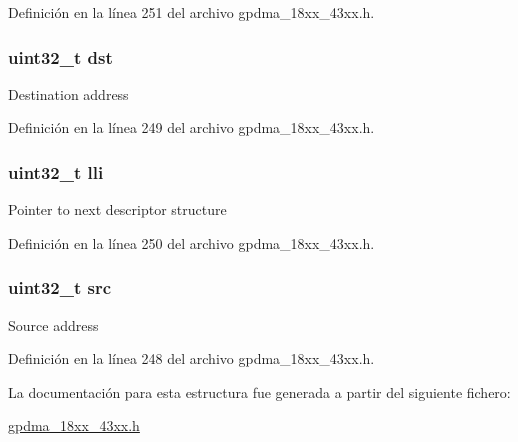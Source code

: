 Definición en la línea 251 del archivo gpdma\+\_\+18xx\+\_\+43xx.\+h.

\subsubsection[{\texorpdfstring{dst}{dst}}]{\setlength{\rightskip}{0pt plus 5cm}uint32\+\_\+t dst}\hypertarget{struct_d_m_a___transfer_descriptor_aa8b6a0c5900928c04c0cb42248821ce5}{}\label{struct_d_m_a___transfer_descriptor_aa8b6a0c5900928c04c0cb42248821ce5}
Destination address 

Definición en la línea 249 del archivo gpdma\+\_\+18xx\+\_\+43xx.\+h.

\subsubsection[{\texorpdfstring{lli}{lli}}]{\setlength{\rightskip}{0pt plus 5cm}uint32\+\_\+t lli}\hypertarget{struct_d_m_a___transfer_descriptor_a76f31eac518fe9f46e705a8a9610b12c}{}\label{struct_d_m_a___transfer_descriptor_a76f31eac518fe9f46e705a8a9610b12c}
Pointer to next descriptor structure 

Definición en la línea 250 del archivo gpdma\+\_\+18xx\+\_\+43xx.\+h.

\subsubsection[{\texorpdfstring{src}{src}}]{\setlength{\rightskip}{0pt plus 5cm}uint32\+\_\+t src}\hypertarget{struct_d_m_a___transfer_descriptor_a0d6d2cdb1162c6355e40ab772fa5debc}{}\label{struct_d_m_a___transfer_descriptor_a0d6d2cdb1162c6355e40ab772fa5debc}
Source address 

Definición en la línea 248 del archivo gpdma\+\_\+18xx\+\_\+43xx.\+h.



La documentación para esta estructura fue generada a partir del siguiente fichero\+:\begin{DoxyCompactItemize}
\item 
\hyperlink{gpdma__18xx__43xx_8h}{gpdma\+\_\+18xx\+\_\+43xx.\+h}\end{DoxyCompactItemize}
